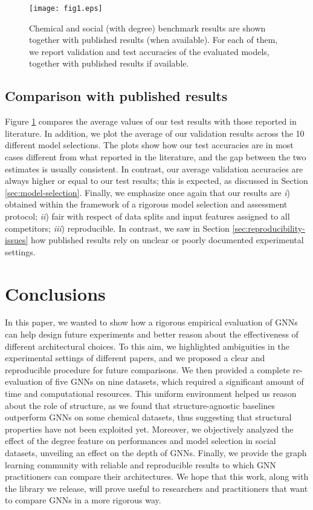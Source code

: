 \documentclass{article}
\begin{document}
\begin{figure}[ht]
   \texttt{[image: fig1.eps]}
   \caption{Chemical and social (with degree) benchmark results are shown together with published results (when available). For each of them, we report validation and test accuracies of the evaluated models, together with published results if available.}
   \label{fig:results-plot}
\end{figure}

\subsection{Comparison with published results}
Figure \ref{fig:results-plot} compares the average values of our test results with those reported in literature. In addition, we plot the average of our validation results across the 10 different model selections. The plots show how our test accuracies are in most cases different from what reported in the literature, and the gap between the two estimates is usually consistent. In contrast, our average validation accuracies are always higher or equal to our test results; this is expected, as discussed in Section \ref{sec:model-selection}.
Finally, we emphasize once again that our results are \emph{i}) obtained within the framework of a rigorous model selection and assessment protocol; \emph{ii}) fair with respect of data splits and input features assigned to all competitors; \emph{iii}) reproducible. In contrast, we saw in Section \ref{sec:reproducibility-issues} how published results rely on unclear or poorly documented experimental settings. \section{Conclusions}
In this paper, we wanted to show how a rigorous empirical evaluation of GNNs can help design future experiments and better reason about the effectiveness of different architectural choices. To this aim, we highlighted ambiguities in the experimental settings of different papers, and we proposed a clear and reproducible procedure for future comparisons. We then provided a complete re-evaluation of five GNNs on nine datasets, which required a significant amount of time and computational resources. This uniform environment helped us reason about the role of structure, as we found that structure-agnostic baselines outperform GNNs on some chemical datasets, thus suggesting that structural properties have not been exploited yet. Moreover, we objectively analyzed the effect of the degree feature on performances and model selection in social datasets, unveiling an effect on the depth of GNNs. Finally, we provide the graph learning community with reliable and reproducible results to which GNN practitioners can compare their architectures. We hope that this work, along with the library we release, will prove useful to researchers and practitioners that want to compare GNNs in a more rigorous way.
 
\end{document}
